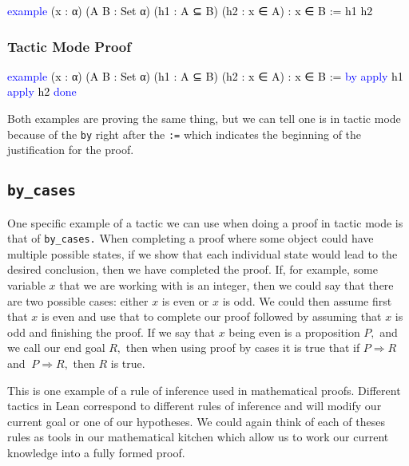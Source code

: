 \documentclass[
  letterpaper,
]{scrreprt}
\newenvironment{Shaded}{\begin{snugshade}}{\end{snugshade}}
\newcommand{\KeywordTok}[1]{\textcolor[rgb]{0.00,0.23,0.31}{#1}}
\newcommand{\NormalTok}[1]{\textcolor[rgb]{0.00,0.23,0.31}{#1}}
\renewcommand{\NormalTok}[1]{\textcolor[HTML]{000000}{#1}}
\renewcommand{\KeywordTok}[1]{\textcolor[HTML]{0000FF}{#1}}
\theoremstyle{remark}
\begin{document}
\begin{Shaded}
\begin{Highlighting}[]
\KeywordTok{example}\NormalTok{ (x : α) (A B : Set α) (h1 : A ⊆ B) }
\NormalTok{    (h2 : x ∈ A) : x ∈ B := h1 h2}
\end{Highlighting}
\end{Shaded}

\hypertarget{tactic-mode-proof}{%
\subsubsection{Tactic Mode Proof}\label{tactic-mode-proof}}

\begin{Shaded}
\begin{Highlighting}[]
\KeywordTok{example}\NormalTok{ (x : α) (A B : Set α) (h1 : A ⊆ B) }
\NormalTok{    (h2 : x ∈ A) : x ∈ B := }\KeywordTok{by}
  \KeywordTok{apply}\NormalTok{ h1}
  \KeywordTok{apply}\NormalTok{ h2}
  \KeywordTok{done}
\end{Highlighting}
\end{Shaded}

Both examples are proving the same thing, but we can tell one is in
tactic mode because of the \texttt{by} right after the \texttt{:=} which
indicates the beginning of the justification for the proof.

\hypertarget{by_cases}{%
\subsection{\texorpdfstring{\texttt{by\_cases}}{by\_cases}}\label{by_cases}}

One specific example of a tactic we can use when doing a proof in tactic
mode is that of \texttt{by\_cases.} When completing a proof where some
object could have multiple possible states, if we show that each
individual state would lead to the desired conclusion, then we have
completed the proof. If, for example, some variable \(x\) that we are
working with is an integer, then we could say that there are two
possible cases: either \(x\) is even or \(x\) is odd. We could then
assume first that \(x\) is even and use that to complete our proof
followed by assuming that \(x\) is odd and finishing the proof. If we
say that \(x\) being even is a proposition \(P,\) and we call our end
goal \(R,\) then when using proof by cases it is true that if
\(P \Rightarrow R\) and \(~P \Rightarrow R,\) then \(R\) is true.

This is one example of a rule of inference used in mathematical proofs.
Different tactics in Lean correspond to different rules of inference and
will modify our current goal or one of our hypotheses. We could again
think of each of theses rules as tools in our mathematical kitchen which
allow us to work our current knowledge into a fully formed proof.
\end{document}
